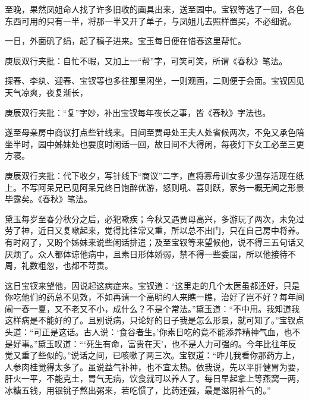 \begin{parag}
    至晚，果然凤姐命人找了许多旧收的画具出来，送至园中。宝钗等选了一回，各色东西可用的只有一半，将那一半又开了单子，与凤姐儿去照样置买，不必细说。
\end{parag}


\begin{parag}
    一日，外面矾了绢，起了稿子进来。宝玉每日便在惜春这里帮忙。\begin{note}庚辰双行夹批：自忙不暇，又加上一“帮”字，可笑可笑，所谓《春秋》笔法。\end{note}探春、李纨、迎春、宝钗等也多往那里闲坐，一则观画，二则便于会面。宝钗因见天气凉爽，夜复渐长，\begin{note}庚辰双行夹批：“复”字妙，补出宝钗每年夜长之事，皆《春秋》字法也。\end{note}遂至母亲房中商议打点些针线来。日间至贾母处王夫人处省候两次，不免又承色陪坐半时，园中姊妹处也要度时闲话一回，故日间不大得闲，每夜灯下女工必至三更方寝。\begin{note}庚辰双行夹批：代下收夕，写针线下“商议”二字，直将寡母训女多少温存活现在纸上。不写阿呆兄已见阿呆兄终日饱醉优游，怒则吼、喜则跃，家务一概无闻之形景毕露矣。《春秋》笔法。\end{note}黛玉每岁至春分秋分之后，必犯嗽疾；今秋又遇贾母高兴，多游玩了两次，未免过劳了神，近日又复嗽起来，觉得比往常又重，所以总不出门，只在自己房中将养。有时闷了，又盼个姊妹来说些闲话排遣；及至宝钗等来望候他，说不得三五句话又厌烦了。众人都体谅他病中，且素日形体娇弱，禁不得一些委屈，所以他接待不周，礼数粗忽，也都不苛责。
\end{parag}


\begin{parag}
    这日宝钗来望他，因说起这病症来。宝钗道：“这里走的几个太医虽都还好，只是你吃他们的药总不见效，不如再请一个高明的人来瞧一瞧，治好了岂不好？每年间闹一春一夏，又不老又不小，成什么？不是个常法。”黛玉道：“不中用。我知道我这样病是不能好的了。且别说病，只论好的日子我是怎么形景，就可知了。”宝钗点头道：“可正是这话。古人说：‘食谷者生。’你素日吃的竟不能添养精神气血，也不是好事。”黛玉叹道：“‘死生有命，富贵在天’，也不是人力可强的。今年比往年反觉又重了些似的。”说话之间，已咳嗽了两三次。宝钗道：“昨儿我看你那药方上，人参肉桂觉得太多了。虽说益气补神，也不宜太热。依我说，先以平肝健胃为要，肝火一平，不能克土，胃气无病，饮食就可以养人了。每日早起拿上等燕窝一两，冰糖五钱，用银铫子熬出粥来，若吃惯了，比药还强，最是滋阴补气的。”
\end{parag}


